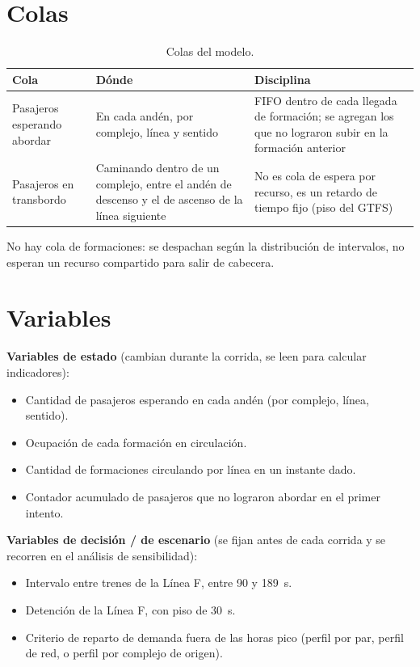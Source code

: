 \documentclass{article}
\begin{document}
\section{Colas}

\begin{table}[H]
\centering
\small
\begin{tabular}{@{}L{4.5cm}L{4.5cm}L{4.5cm}@{}}
\toprule
Cola & Dónde & Disciplina \\
\midrule
Pasajeros esperando abordar & En cada andén, por complejo, línea y sentido & FIFO
  dentro de cada llegada de formación; se agregan los que no lograron subir en la
  formación anterior \\
Pasajeros en transbordo & Caminando dentro de un complejo, entre el andén de
  descenso y el de ascenso de la línea siguiente & No es cola de espera por
  recurso, es un retardo de tiempo fijo (piso del GTFS) \\
\bottomrule
\end{tabular}
\caption{Colas del modelo.}
\end{table}

No hay cola de formaciones: se despachan según la distribución de intervalos, no
esperan un recurso compartido para salir de cabecera.

\section{Variables}
\label{sec:variables}

\textbf{Variables de estado} (cambian durante la corrida, se leen para calcular
indicadores):
\begin{itemize}
  \item Cantidad de pasajeros esperando en cada andén (por complejo, línea,
    sentido).
  \item Ocupación de cada formación en circulación.
  \item Cantidad de formaciones circulando por línea en un instante dado.
  \item Contador acumulado de pasajeros que no lograron abordar en el primer
    intento.
\end{itemize}

\textbf{Variables de decisión / de escenario} (se fijan antes de cada corrida y se
recorren en el análisis de sensibilidad):
\begin{itemize}
  \item Intervalo entre trenes de la Línea F, entre 90 y 189~s.
  \item Detención de la Línea F, con piso de 30~s.
  \item Criterio de reparto de demanda fuera de las horas pico (perfil por par,
    perfil de red, o perfil por complejo de origen).
\end{itemize}
\end{document}
